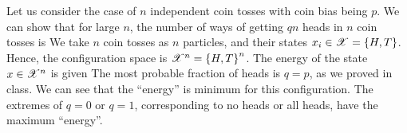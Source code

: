 \documentclass[letterpaper,english,10pt]{article}
\begin{document}
\begin{shaded*}
\begin{exmp} 
Let us consider the case of $n$ independent coin tosses with coin bias being $p$. 
We can show that for large $n$, 
the number of ways of getting $qn$ heads in $n$ coin tosses is 
We take $n$ coin tosses as $n$ particles, and their states $x_i \in \mathscr{X} = \left\{H,T\right\}$. 
Hence, the configuration space is $\mathscr{X}^n = \left\{H,T\right\}^n$. 
The energy of the state $x \in \mathscr{X}^n$ is  given 
The most probable fraction of heads is $q=p$, as we proved in class. 
We can see that the ``energy'' is minimum for this configuration. 
The extremes of $q=0$ or $q=1$, corresponding to no heads or all heads, have the maximum ``energy''.
\end{exmp}
\end{shaded*}
\end{document}

